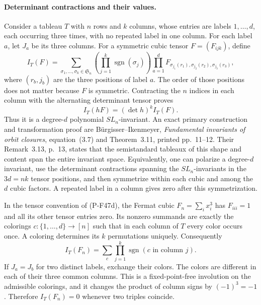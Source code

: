 \documentclass[11pt,a4paper]{article}
\begin{document}
\paragraph{Determinant contractions and their values.}
Consider a tableau $T$ with $n$ rows and $k$ columns,
whose entries are labels $1,\ldots,d$, each occurring
three times, with no repeated label in one column.
For each label $a$, let $J_a$ be its three columns.
For a symmetric cubic tensor $F=(F_{ijk})$, define
\[
 I_T(F)=\sum_{\sigma_1,\ldots,\sigma_k\in\mathfrak S_n}
       \left(\prod_{j=1}^k\operatorname{sgn}(\sigma_j)\right)
       \prod_{a=1}^d
       F_{\sigma_{j_1}(r_1),\sigma_{j_2}(r_2),
                                      \sigma_{j_3}(r_3)},
                                                        \tag{P-F47d}
\]
where $(r_b,j_b)$ are the three positions of label $a$.
The order of those positions does not matter because
$F$ is symmetric. Contracting the $n$ indices in each
column with the alternating determinant tensor proves
\[
                    I_T(hF)=(\det h)^k I_T(F).
                                                        \tag{P-F47e}
\]
Thus it is a degree-$d$ polynomial $SL_n$-invariant.
An exact primary construction and transformation proof
are B\"urgisser--Ikenmeyer, \emph{Fundamental invariants
of orbit closures}, equation~(3.7) and Theorem~3.11,
printed pp.~11--12. Their Remark~3.13, p.~13, states
that the semistandard tableaux of this shape and content
span the entire invariant space. Equivalently, one can
polarize a degree-$d$ invariant, use the determinant
contractions spanning the $SL_n$-invariants in the
$3d=nk$ tensor positions, and then symmetrize within
each cubic and among the $d$ cubic factors. A repeated
label in a column gives zero after this symmetrization.

In the tensor convention of (P-F47d), the Fermat cubic
$F_n=\sum_i x_i^3$ has $F_{iii}=1$ and all its other
tensor entries zero. Its nonzero summands are exactly
the colorings $c:\{1,\ldots,d\}\to[n]$ such that in
each column of $T$ every color occurs once. A coloring
determines its $k$ permutations uniquely. Consequently
\[
 I_T(F_n)=\sum_c\prod_{j=1}^k
                  \operatorname{sgn}(c\text{ in column }j).
                                                        \tag{P-F47f}
\]
If $J_a=J_b$ for two distinct labels, exchange their
colors. The colors are different in each of their
three common columns. This is a fixed-point-free
involution on the admissible colorings, and it changes
the product of column signs by $(-1)^3=-1$.
Therefore $I_T(F_n)=0$ whenever two triples coincide.
\end{document}

